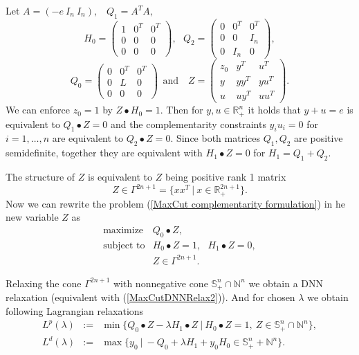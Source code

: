 \documentclass[12pt]{book}
\theoremstyle{definition}
\begin{document}
Let $A = (-e \ I_n \ I_n),$ \ $Q_1 = A^TA,$ 
$$ 
H_0 = \left(\begin{array}{lll}
1 & 0^T & 0^T \\
0 & 0	& 0 \\
0 & 0	& 0
\end{array}\right), \ \ \
Q_2 = \left(\begin{array}{lll}
0 & 0^T & 0^T \\
0 & 0	& I_n \\
0 & I_n	& 0
\end{array}\right), 
$$ 
$$
Q_0 = \left(\begin{array}{lll}
0 & 0^T  & 0^T \\
0 & L & 0\\
0 & 0 & 0
\end{array}\right)
\ \ \mbox{and } \ \ \ Z = \left(\begin{array}{lll}
z_0 & y^T  & u^T \\
y & yy^T & yu^T \\
u & uy^T & uu^T
\end{array}\right). 
$$
We can enforce $z_0 = 1$ by $Z\bullet H_0 = 1$. Then for $y,u\in \mathbb{R}^n_+$ it holds that 
$y+u = e$ is equivalent to $Q_1\bullet Z = 0$ and 
the complementarity constraints $y_iu_i = 0$ for $i = 1,\dots ,n$ are equivalent to $Q_2\bullet Z = 0$. Since both matrices $Q_1,Q_2$ are positive semidefinite, together they are equivalent with $H_1\bullet Z = 0$ for $H_1 = Q_1 + Q_2$. 

The structure of $Z$ is equivalent to $Z$ being positive rank 1 matrix
$$Z\in\Gamma^{2n+1} = \{ xx^T \ \vert \ x\in\mathbb{R}^{2n+1}_+\}. $$ 
Now we can rewrite the problem (\ref{MaxCut complementarity formulation}) in he new variable $Z$ as 	
\begin{equation}
\begin{array}{ll}
\mbox{maximize} &  Q_0\bullet Z, \\
\mbox{subject to} & H_0 \bullet Z = 1, \ \ \ H_1\bullet Z = 0, \\
				& Z \in \Gamma^{2n+1}.
\end{array}	
\end{equation}

Relaxing the cone $\Gamma^{2n+1}$ with nonnegative cone $\mathbb{S}^n_+ \cap \mathbb{N}^n$ we obtain a DNN relaxation (equivalent with (\ref{MaxCutDNNRelax2})). And for chosen $\lambda$ we obtain following Lagrangian relaxations
\begin{eqnarray}
\label{MaxCutDNN3p}
L^p(\lambda) &:=& \min \{ Q_0\bullet Z  - \lambda H_1\bullet Z\ \vert \ H_0\bullet Z = 1, \ Z\in \mathbb{S}^n_+ \cap \mathbb{N}^n \}, \\
\label{MaxCutDNN3d}
L^d(\lambda) &:=& \max \{ y_0\ \vert \  - Q_0 + \lambda H_1 + y_0H_0  \in \mathbb{S}^n_+ + \mathbb{N}^n \}.
\end{eqnarray}
\end{document}
